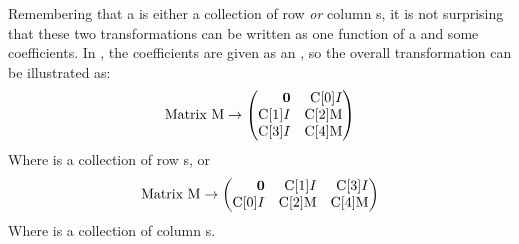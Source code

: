 Remembering that a  is either a collection of row \textit{or} column s, it is not surprising that these two transformations can be written as one function of a  and some coefficients.  In , the coefficients are given as an , so the overall transformation can be illustrated as:
\newcommand{\CA}[1]{\mli{C[#1]}}
\[ \mli{Matrix M} \to 
    \begin{pmatrix*}[r] 
      \0 & \CA{0}I \\ 
      \CA{1}I & \CA{2}\mli{M} \\ 
      \CA{3}I & \CA{4}\mli{M} 
    \end{pmatrix*} \]
Where  is a collection of row s, or
\[ \mli{Matrix M} \to 
  \begin{pmatrix*}[r] 
    \0 & \CA{1}I & \CA{3}I \\ 
    \CA{0}I & \CA{2}\mli{M} & \CA{4}\mli{M} 
  \end{pmatrix*} \]
Where  is a collection of column s.
\lstgeneralizedlift

\lstliftvcone
\lstlifthcone
\lstconetransform
\lstvconetohcone
\lsthconetovcone

\subsection{}
\lsthpolytohcone
\lsthconetohpoly
\lstvpolytovcone
\lstnormalizedP
\lstvconetovpoly
\lsthpolytovpoly
\lstvpolytohpoly

\subsection{}
\lsthconetestcasea
\lstvconetestcasea
\lsthpolytestcaseb
\lstvpolytestcaseb

\subsection{}
\lstoperator
\lstnorm
\lstapproximatelyzeroa
\lstapproximatelyltzero
\lstapproximatelyzerob
\lstisequivalent
\lstisequal
\lsthasequivalentmember
\lsthasequalmember
\lstsubsetmodeq
\lstsubset
\lstraysatisfieda
\lstraysatisfiedb
\lstrayssatisfied
\lstvecsatisfieda
\lstvecsatisfiedb
\lstvecssatisfied
\lstequivalentconerep
\lstequivalenthpolyrep
\lstequivalentvpolyrep
\lsthconetestcaseb
\lstvconetestcaseb
\lsthpolytestcasea
\lstvpolytestcasea


